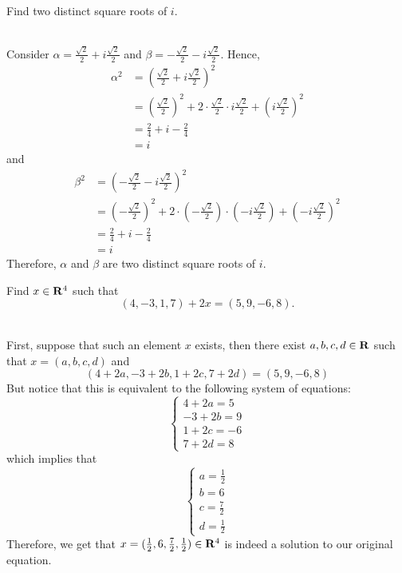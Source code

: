 \begin{exercise}
    Find two distinct square roots of $i$.\\
\end{exercise}

\begin{solution}
    \\ Consider $\alpha = \frac{\sqrt{2}}{2} + i\frac{\sqrt{2}}{2}$ and $\beta = -\frac{\sqrt{2}}{2} - i\frac{\sqrt{2}}{2}$. Hence,
    \begin{align*}
        \alpha^2 &= \left(\frac{\sqrt{2}}{2} + i\frac{\sqrt{2}}{2}\right)^2 \\
        &= \left(\frac{\sqrt{2}}{2}\right)^2 + 2\cdot \frac{\sqrt{2}}{2} \cdot i\frac{\sqrt{2}}{2} + \left(i\frac{\sqrt{2}}{2}\right)^2 \\
        &= \frac{2}{4} + i - \frac{2}{4} \\
        &= i
    \end{align*}
    and
    \begin{align*}
        \beta^2 &= \left(-\frac{\sqrt{2}}{2} - i\frac{\sqrt{2}}{2}\right)^2 \\
        &= \left(-\frac{\sqrt{2}}{2}\right)^2 + 2\cdot \left( -\frac{\sqrt{2}}{2}\right)\cdot \left( - i\frac{\sqrt{2}}{2}\right) + \left(-i\frac{\sqrt{2}}{2}\right)^2 \\
        &= \frac{2}{4} + i - \frac{2}{4} \\
        &= i
    \end{align*}
    Therefore, $\alpha$ and $\beta$ are two distinct square roots of $i$. \\
\end{solution}

\begin{exercise}
    Find $x \in \mathbf{R}^4$ such that
    $$(4, -3, 1, 7) + 2x = (5, 9, -6, 8).$$
\end{exercise}

\begin{solution}
    \\ First, suppose that such an element $x$ exists, then there exist $a,b,c,d \in \mathbf{R}$ such that $x = (a,b,c,d)$ and 
    $$(4 + 2a, -3 + 2b, 1 + 2c, 7 + 2d) = (5, 9, -6, 8)$$
    But notice that this is equivalent to the following system of equations:
    $$\begin{cases}
        4 + 2a = 5 \\ -3 +2b = 9 \\ 1 + 2c = -6 \\ 7 + 2d = 8
    \end{cases}$$
    which implies that
    $$\begin{cases}
        a = \frac{1}{2} \\ b = 6 \\ c = \frac{7}{2} \\ d = \frac{1}{2}
    \end{cases}$$
    Therefore, we get that $x = (\frac{1}{2}, 6, \frac{7}{2}, \frac{1}{2}) \in \mathbf{R}^4$ is indeed a solution to our original equation. \\
\end{solution}

